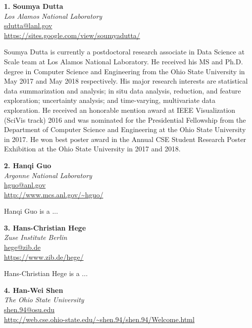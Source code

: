 \documentclass[preprint,journal]{vgtc}       %
\newcommand{\addverticalspace}{\vspace{3mm}}
\begin{document}
\noindent \textbf{1. Soumya Dutta}\\
\emph{Los Alamos National Laboratory}\\
\href{mailto:sdutta@lanl.gov}{sdutta@lanl.gov}\\
\url{https://sites.google.com/view/soumyadutta/}

\addverticalspace

Soumya Dutta is currently a postdoctoral research associate in Data Science at Scale team at Los Alamos National Laboratory. He received his MS and Ph.D. degree in Computer Science and Engineering from the Ohio State University in May 2017 and May 2018 respectively. His major research interests are statistical data summarization and analysis; in situ data analysis, reduction, and feature exploration; uncertainty analysis; and time-varying, multivariate data exploration. He received an honorable mention award at IEEE Visualization (SciVis track) 2016 and was nominated for the Presidential Fellowship from the Department of Computer Science and Engineering at the Ohio State University in 2017. He won best poster award in the Annual CSE Student Research Poster Exhibition at the Ohio State University in 2017 and 2018.

\printbibliography[title={Relevant Publications},category=Dutta]

\addverticalspace

\noindent \textbf{2. Hanqi Guo}\\
\emph{Argonne National Laboratory}\\
\href{mailto:hguo@anl.gov}{hguo@anl.gov}\\
\url{http://www.mcs.anl.gov/~hguo/}

\addverticalspace

Hanqi Guo is a ...

\printbibliography[title={Relevant Publications},category=Guo]

\addverticalspace

\noindent \textbf{3. Hans-Christian Hege}\\
\emph{Zuse Institute Berlin}\\
\href{mailto:hege@zib.de}{hege@zib.de}\\
\url{https://www.zib.de/hege/}

\addverticalspace

Hans-Christian Hege is a ...

\printbibliography[title={Relevant Publications},category=Hege]


\noindent \textbf{4. Han-Wei Shen}\\
\emph{The Ohio State University}\\
\href{mailto:shen.94@osu.edu}{shen.94@osu.edu}\\
\url{http://web.cse.ohio-state.edu/~shen.94/shen.94/Welcome.html}
\end{document}
